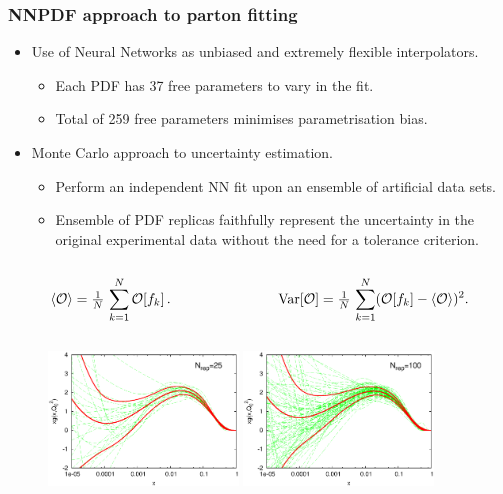 \documentclass[10pt]{beamer}
\newcommand{\be}{\begin{equation*}}
\newcommand{\ee}{\end{equation*}}
\def\smallfrac#1#2{\hbox{${{#1}\over {#2}}$}}
\begin{document}
\begin{frame}
\frametitle{NNPDF approach to parton fitting}
\begin{itemize}
\item<1->Use of Neural Networks as unbiased and extremely flexible interpolators.
\begin{itemize}
\item<1->Each PDF has 37 free parameters to vary in the fit.
\item<1->Total of 259 free parameters minimises parametrisation bias.
\end{itemize}

\item<1->Monte Carlo approach to uncertainty estimation.
\begin{itemize}
\item<1->Perform an independent NN fit upon an ensemble of artificial data sets.\\
\item<1->Ensemble of PDF replicas faithfully represent the uncertainty in the original experimental data without the need for a tolerance criterion.
\end{itemize}
\end{itemize}
\begin{columns}
  \begin{column}{0.25\textwidth}
		\be \langle\mathcal{O}\rangle=\smallfrac{1}{N}\,\sum_{k=1}^{N}\mathcal{O}[f_k]\, .\ee
  \end{column}
  
    \begin{column}{0.4\textwidth}
		\be {\mathrm{Var}}[\mathcal{O}]=\smallfrac{1}{N}\,\sum_{k=1}^{N}(\mathcal{O}[f_k] -  \langle\mathcal{O}\rangle )^2 .\ee
  \end{column}  
  \end{columns}

 \begin{figure}[b!]
    \begin{center}
      \includegraphics[width=0.45\textwidth]{glureplicas25.eps}
      \includegraphics[width=0.45\textwidth]{glureplicas100.eps}
    \end{center}
    \vskip-0.5cm
    \label{fig:pdf-jets}
\end{figure}


\end{frame}
\end{document}
